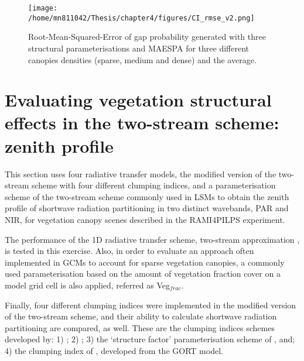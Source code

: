 \documentclass[a4paper,11pt]{report}
\begin{document}

\begin{figure}
\centering
\texttt{[image: /home/mn811042/Thesis/chapter4/figures/CI\_rmse\_v2.png]}
\caption{Root-Mean-Squared-Error of gap probability generated with three structural parameterisations and MAESPA for three different canopies densities (sparse, medium and dense) and the average.} 
\label{fig:ci_rmse}
\end{figure}

\section{Evaluating vegetation structural effects in the two-stream scheme: zenith profile}

This section uses four radiative transfer models, the modified version of the two-stream scheme with four different clumping indices, and a parameterisation scheme of the two-stream scheme commonly used in LSMs to obtain the zenith profile of shortwave radiation partitioning in two distinct wavebands, PAR and NIR, for vegetation canopy scenes described in the RAMI4PILPS experiment.


The performance of the 1D radiative transfer scheme, two-stream approximation \citep{Sellers1985}, is tested in this exercise. Also, in order to evaluate an approach often implemented in GCMs to account for sparse vegetation canopies, a commonly used parameterisation based on the amount of vegetation fraction cover on a model grid cell is also applied, referred as Veg$_{frac}$.

Finally, four different clumping indices were implemented in the modified version of the two-stream scheme, and their ability to calculate shortwave radiation partitioning are compared, as well. These are the clumping indices schemes developed by: 1) \citet{Nilson1971}; 2) \citet{Kucharik1999}; 3) the `structure factor' parameterisation scheme of \citet{pinty2006}, and; 4) the clumping index of \citet{Ni-Meister2010}, developed from the GORT model.
\end{document}
